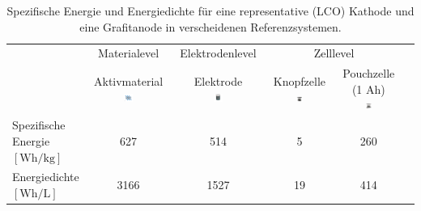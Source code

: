 \begin{table}[ht]
    \centering
    \caption{\label{tab:energy_densities}Spezifische Energie und Energiedichte für eine representative  (LCO) Kathode und eine Grafitanode in verscheidenen Referenzsystemen.\cite{Son2021}}
    \begin{tabular}[t]{lccccc}
    \toprule
    \multirow{2}{*}{}
    &\multirow{1}{*}{Materialevel} %
    &\multirow{1}{*}{Elektrodenlevel}
    &\multicolumn{2}{c}{Zelllevel}
    \\ \cmidrule{2-5}
    &\makecell{Aktivmaterial\\\includegraphics[width=0.125\textwidth]{CathodeMaterials/LiC6.png}\vspace{-1em}}
    &\makecell{Elektrode\\\includegraphics[width=0.1\textwidth]{EnergyDensitiesScales/Electrode.png}\vspace{-1em}}
    &\makecell{Knopfzelle\\\includegraphics[width=0.1\textwidth]{EnergyDensitiesScales/CoinCell.png}\vspace{-1em}}
    &\makecell{Pouchzelle\\(1 Ah)\\\includegraphics[width=0.1\textwidth]{EnergyDensitiesScales/PouchCell.png}\vspace{-1em}}
    \\
    \midrule
    \makecell{Spezifische Energie\\ $\left[ \si{\watt \hour \per \kg} \right]$} & 627 & 514 & 5 & 260\\
    \makecell{Energiedichte\\ $\left[ \si{\watt \hour \per \liter} \right]$} & 3166 & 1527 & 19 & 414\\
    \bottomrule
    \end{tabular}
\end{table}%